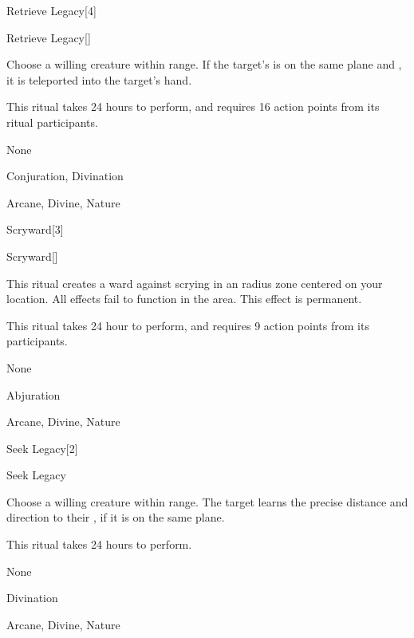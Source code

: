 \begin{spellsection}{Retrieve Legacy}[4]


\begin{ability}{Retrieve Legacy}[]

Choose a willing creature within \rngclose range.
If the target's  is on the same plane and , it is teleported into the target's hand.

This ritual takes 24 hours to perform, and requires 16 action points from its ritual participants.

\end{ability}


 None

 Conjuration, Divination

 Arcane, Divine, Nature
\end{spellsection}


\begin{spellsection}{Scryward}[3]


\begin{ability}{Scryward}[]

This ritual creates a ward against scrying in an \arealarge radius zone centered on your location.
All  effects fail to function in the area.
This effect is permanent.

This ritual takes 24 hour to perform, and requires 9 action points from its participants.

\end{ability}


 None

 Abjuration

 Arcane, Divine, Nature
\end{spellsection}


\begin{spellsection}{Seek Legacy}[2]


\begin{ability}{Seek Legacy}

Choose a willing creature within \rngclose range.
The target learns the precise distance and direction to their , if it is on the same plane.

This ritual takes 24 hours to perform.

\end{ability}


 None

 Divination

 Arcane, Divine, Nature
\end{spellsection}


